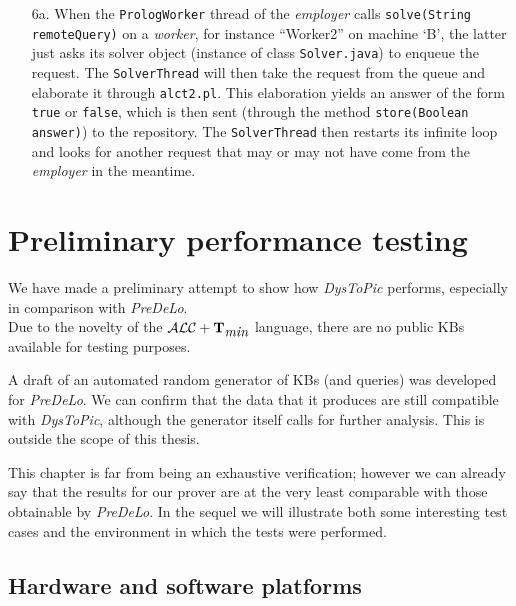 \documentclass[a4paper, 11pt, oneside]{duthesis}
\newcommand{\tip}{{\bf T}}
\newcommand{\alctmin}{\mathcal{ALC}+\tip_{\mbox{\em min}}}
\begin{document}
\begin{enumerate}
\item[6a.]When the \texttt{PrologWorker} thread of the \emph{employer} calls \texttt{solve(String remoteQuery)} on a \emph{worker}, for instance ``Worker2'' on machine `B', the latter just asks its solver object (instance of class \texttt{Solver.java}) to enqueue the request.
The \texttt{SolverThread} will then take the request from the queue and elaborate it through \texttt{alct2.pl}.
This elaboration yields an answer of the form \texttt{true} or \texttt{false}, which is then sent (through the method \texttt{store(Boolean answer)}) to the repository. The \texttt{SolverThread} then restarts its infinite loop and looks for another request that may or may not have come from the \emph{employer} in the meantime.
\end{enumerate}


\newpage

\chapter{Preliminary performance testing}\label{testing}

We have made a preliminary attempt to show how \emph{DysToPic} performs, especially in comparison with \emph{PreDeLo}.\\

Due to the novelty of the $\alctmin$ language, there are no public KBs available for testing purposes.

A draft of an automated random generator of KBs (and queries) was developed for \emph{PreDeLo}.
We can confirm that the data that it produces are still compatible with \emph{DysToPic}, although the generator itself calls for further analysis. This is outside the scope of this thesis.

This chapter is far from being an exhaustive verification; however we can already say that the results for our prover are at the very least comparable with those obtainable by \emph{PreDeLo}.
In the sequel we will illustrate both some interesting test cases and the environment in which the tests were performed.

\section{Hardware and software platforms}
\end{document}
